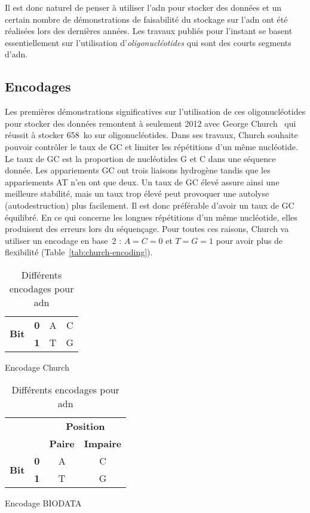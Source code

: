 \documentclass[a4paper]{report}
\begin{document}
Il est donc naturel de penser à utiliser l’\ac{adn} pour stocker des données
et un certain nombre de démonstrations de faisabilité du stockage sur l’\ac{adn} ont été réalisées lors des dernières années.
Les travaux publiés pour l’instant se basent essentiellement sur l’utilisation d’\emph{oligonucléotides} qui sont des courts segments d’\ac{adn}.

\subsection{Encodages}

Les premières démonstrations significatives sur l’utilisation de ces oligonucléotides pour stocker des données remontent à seulement 2012 avec George Church~\cite{church2012next} qui réussit à stocker 658~ko sur  oligonucléotides.
Dans ses travaux, Church souhaite pouvoir contrôler le taux de GC et limiter les répétitions d’un même nucléotide.
Le taux de GC est la proportion de nucléotides G et C dans une séquence donnée. 
Les appariements GC ont trois liaisons hydrogène tandis que les appariements AT n'en ont que deux.
Un taux de GC élevé assure ainsi une meilleure stabilité, mais un taux trop élevé peut provoquer une autolyse (autodestruction) plus facilement.
Il est donc préférable d’avoir un taux de GC équilibré.
En ce qui concerne les longues répétitions d’un même nucléotide, elles produisent des erreurs lors du séquençage.
Pour toutes ces raisons, Church va utiliser un encodage en base~2 : $A=C=0$ et $T=G=1$ pour avoir plus de flexibilité (Table~\ref{tab:church-encoding}).

\begin{table}[ht]
\centering
\setlength{\tabcolsep}{.8em}
\renewcommand\arraystretch{1.5}

\begin{subtable}[t]{.45\textwidth}
  \centering
  \begin{tabular}{|c|c|c|c|}
  \hline
  \multirow{2}{*}{\textbf{Bit}} & \textbf{0} & A & C \\
  \cline{2-4}
  & \textbf{1} & T & G \\
  \hline
  \end{tabular}
  \caption{Encodage Church~\cite{church2012next}}
  \label{tab:church-encoding}
\end{subtable}
\hfill
\begin{subtable}[t]{.54\textwidth}
  \centering
  \begin{tabular}{|c|c|c|c|}
  \cline{3-4}
  \multicolumn{2}{c|}{} & \multicolumn{2}{c|}{\textbf{Position}} \\
  \cline{3-4}
  \multicolumn{2}{c|}{} & \textbf{Paire} & \textbf{Impaire} \\
  \hline
  \multirow{2}{*}{\textbf{Bit}} & \textbf{0} & A & C \\
  \cline{2-4}
  & \textbf{1} & T & G \\
  \hline
  \end{tabular}
  \caption{Encodage BIODATA}
  \label{tab:biodata-encoding}
\end{subtable}

\caption{Différents encodages pour \ac{adn}}
\label{tab:dna-encodings}
\end{table}
\end{document}
